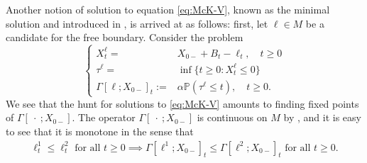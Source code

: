 \documentclass[12pt]{amsart}
\newcommand{\bP}{\mathbb{P}}
\theoremstyle{plain}
\theoremstyle{definition}
\begin{document}
\medskip

Another notion of solution to equation \eqref{eq:McK-V}, known as the minimal solution and introduced in \cite{cuchiero_propagation_2020}, is arrived at as follows: first, let $\ell\in M$ be a candidate for the free boundary. Consider the problem
\begin{equation}\label{eq:Gammadef}
\left\{
\begin{aligned}
X^{\ell}_t=&X_{0-}+B_t- \ell_t,\quad t\ge 0\\
\tau^{\ell}=&\inf \{t\ge 0:X^{\ell}_t\le 0\}\\
\Gamma[\ell;X_{0-}]_t:=&\alpha\bP(\tau^{\ell}\le t), \quad t\ge 0.
\end{aligned}
\right.
\end{equation}
We see that the hunt for solutions to \eqref{eq:McK-V} amounts to finding fixed points of $\Gamma[~\cdot~;X_{0-}]$.
The operator $\Gamma[~\cdot~;X_{0-}]$ is continuous on $M$ by \cite[Proposition 2.1]{cuchiero_propagation_2020}, and it is easy to see that it is monotone in the sense that 
\begin{align}
\ell^1_t\le\ell^2_t\text{ for all }t\ge 0\implies \Gamma[\ell^1;X_{0-}]_t\le \Gamma[\ell^2;X_{0-}]_t\text{ for all }t\ge 0.
\end{align}

\medskip
\end{document}

